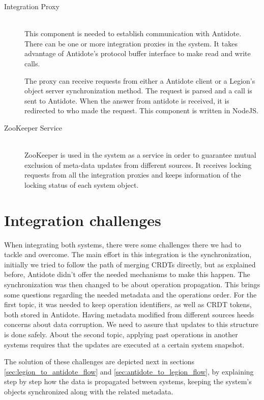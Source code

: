 \begin{description}
\item[Integration Proxy] \hfill \\
This component is needed to establish communication with Antidote. There can be one or more integration proxies in the system. It takes advantage of Antidote's protocol buffer interface to make read and write calls.\par
The proxy can receive requests from either a Antidote client or a Legion's object server synchronization method. The request is parsed and a call is sent to Antidote. When the answer from antidote is received, it is redirected to who made the request. This component is written in NodeJS.

\item[ZooKeeper Service] \hfill \\
ZooKeeper is used in the system as a service in order to guarantee mutual exclusion of meta-data updates from different sources. It receives locking requests from all the integration proxies and keeps information of the locking status of each system object.

\end{description}

\section{Integration challenges}
\label{sec:integration_challenges}
When integrating both systems, there were some challenges there we had to tackle and overcome. The main effort in this integration is the synchronization, initially we tried to follow the path of merging CRDTs directly, but as explained before, Antidote didn't offer the needed mechanisms to make this happen. The synchronization was then changed to be about operation propagation. This brings some questions regarding the needed metadata and the operations order. For the first topic, it was needed to keep operation identifiers, as well as CRDT tokens, both stored in Antidote. Having metadata modified from different sources heeds concerns about data corruption. We need to assure that updates to this structure is done safely. About the second topic, applying past operations in another systems requires that the updates are executed at a certain system snapshot.\par
	The solution of these challenges are depicted next in sections \ref{sec:legion_to_antidote_flow} and \ref{sec:antidote_to_legion_flow}, by explaining step by step how the data is propagated between systems, keeping the system's objects synchronized along with the related metadata.

